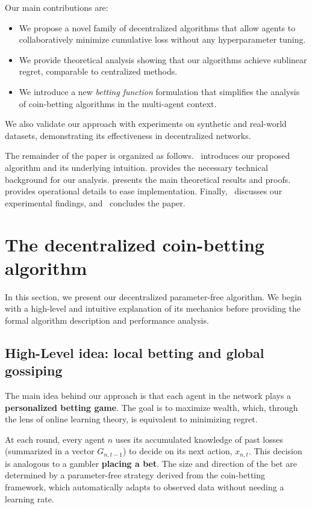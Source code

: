 \documentclass[journal]{IEEEtran} %
\begin{document}
Our main contributions are:
\begin{itemize}
    \item We propose a novel family of decentralized algorithms that allow agents to collaboratively minimize cumulative loss without any hyperparameter tuning.
    \item We provide theoretical analysis showing that our algorithms achieve sublinear regret, comparable to centralized methods.
    \item We introduce a new \emph{betting function} formulation that simplifies the analysis of coin-betting algorithms in the multi-agent context.
\end{itemize}
We also validate our approach with experiments on synthetic and real-world datasets, demonstrating its effectiveness in decentralized networks.

The remainder of the paper is organized as follows.~ introduces our proposed algorithm and its underlying intuition.
 provides the necessary technical background for our analysis.
 presents the main theoretical results and proofs.
 provides operational details to ease implementation.
Finally,~ discusses our experimental findings, and~ concludes the paper.

\section{The decentralized coin-betting algorithm}\label{sec:algorithm}
In this section, we present our decentralized parameter-free algorithm.
We begin with a high-level and intuitive explanation of its mechanics before providing the formal algorithm description and performance analysis.

\subsection{High-Level idea: local betting and global gossiping}
The main idea behind our approach is that each agent in the network plays a \textbf{personalized betting game}.
The goal is to maximize wealth, which, through the lens of online learning theory, is equivalent to minimizing regret.

At each round, every agent $n$ uses its accumulated knowledge of past losses (summarized in a vector $G_{n,t-1}$) to decide on its next action, $x_{n,t}$.
This decision is analogous to a gambler \textbf{placing a bet}.
The size and direction of the bet are determined by a parameter-free strategy derived from the coin-betting framework, which automatically adapts to observed data without needing a learning rate.
\end{document}
